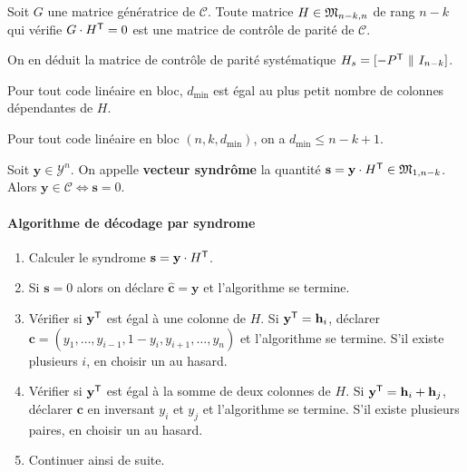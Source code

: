 	\begin{thm}
		Soit $G$ une matrice génératrice de $\mathcal{C}$.
		Toute matrice $H \in \mathfrak{M}_{n - k, n}$ de rang $n - k$ qui vérifie $G \cdot H^\mathsf{T} = 0$ est une matrice de contrôle de parité de $\mathcal{C}$.
	\end{thm}

	On en déduit la matrice de contrôle de parité systématique $H_s = [-P^\mathsf{T} \ \Vert \ I_{n - k}]$.

	\begin{thm}
		Pour tout code linéaire en bloc, $d_{\min}$ est égal au plus petit nombre de colonnes dépendantes de $H$.
	\end{thm}

	\begin{thm}
		Pour tout code linéaire en bloc $(n,k,d_{\min})$, on a $d_{\min} \leq n - k + 1$.
	\end{thm}

	\begin{defn}
		Soit $\mathbf{y} \in \mathcal{Y}^n$.
		On appelle \textbf{vecteur syndrôme} la quantité $\mathbf{s} = \mathbf{y} \cdot H^\mathsf{T} \in \mathfrak{M}_{1,n - k}$.
		Alors $\mathbf{y} \in \mathcal{C} \iff \mathbf{s} = 0$.
	\end{defn}

	\paragraph{Algorithme de décodage par syndrome}
		\begin{enumerate}
			\item Calculer le syndrome $\mathbf{s} = \mathbf{y} \cdot H^\mathsf{T}$.
			\item Si $\mathbf{s} = 0$ alors on déclare $\mathbf{\hat{c}} = \mathbf{y}$ et l'algorithme se termine.
			\item Vérifier si $\mathbf{y}^\mathsf{T}$ est égal à une colonne de $H$.
				Si $\mathbf{y}^\mathsf{T} = \mathbf{h}_i$, déclarer $\mathbf{c} = (y_1,\ldots,y_{i - 1},1 - y_i,y_{i + 1},\ldots,y_n)$ et l'algorithme se termine.
				S'il existe plusieurs $i$, en choisir un au hasard.
			\item Vérifier si $\mathbf{y}^\mathsf{T}$ est égal à la somme de deux colonnes de $H$.
				Si $\mathbf{y}^\mathsf{T} = \mathbf{h}_i + \mathbf{h}_j$, déclarer $\mathbf{c}$ en inversant $y_i$ et $y_j$ et l'algorithme se termine.
				S'il existe plusieurs paires, en choisir un au hasard.
			\item Continuer ainsi de suite.
		\end{enumerate}

